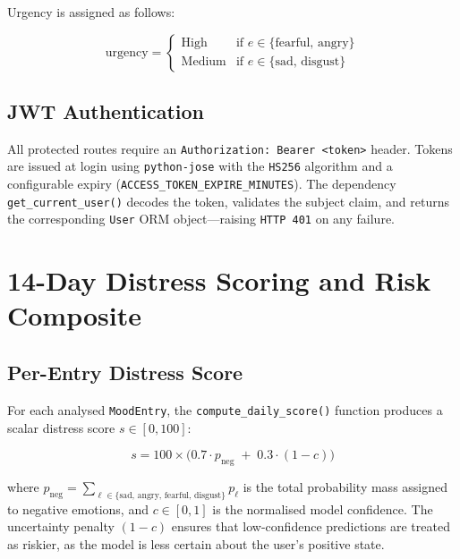 \documentclass[12pt,a4paper]{article}
\begin{document}
Urgency is assigned as follows:

\begin{equation}
\text{urgency} =
\begin{cases}
\text{High}   & \text{if } e \in \{\text{fearful, angry}\} \\
\text{Medium} & \text{if } e \in \{\text{sad, disgust}\}
\end{cases}
\end{equation}

\subsection{JWT Authentication}

All protected routes require an \texttt{Authorization: Bearer <token>} header.
Tokens are issued at login using \texttt{python-jose} with the
\texttt{HS256} algorithm and a configurable expiry
(\texttt{ACCESS\_TOKEN\_EXPIRE\_MINUTES}). The dependency
\texttt{get\_current\_user()} decodes the token, validates the subject claim,
and returns the corresponding \texttt{User} ORM object—raising
\texttt{HTTP~401} on any failure.

\section{14-Day Distress Scoring and Risk Composite}
\label{sec:risk}

\subsection{Per-Entry Distress Score}

For each analysed \texttt{MoodEntry}, the \texttt{compute\_daily\_score()}
function produces a scalar distress score $s \in [0, 100]$:

\begin{equation}
s = 100 \times \bigl(0.7 \cdot p_{\text{neg}} \;+\; 0.3 \cdot (1 - c)\bigr)
\end{equation}

where $p_{\text{neg}} = \sum_{\ell \in \{\text{sad, angry, fearful, disgust}\}} p_\ell$
is the total probability mass assigned to negative emotions, and
$c \in [0, 1]$ is the normalised model confidence. The uncertainty penalty
$(1 - c)$ ensures that low-confidence predictions are treated as riskier, as
the model is less certain about the user's positive state.
\end{document}
